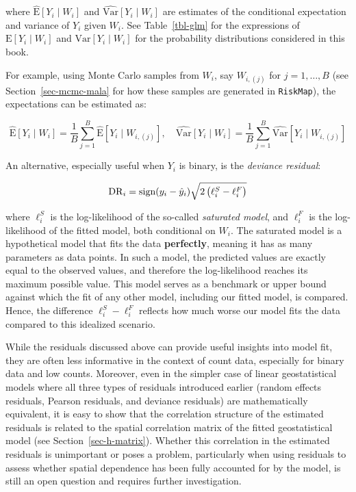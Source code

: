 \documentclass[
  letterpaper,
]{krantz}
\begin{document}
where \(\hat{\text{E}}\left[Y_i \mid W_i\right]\) and
\(\hat{\text{Var}}\left[Y_i \mid W_i\right]\) are estimates of the
conditional expectation and variance of \(Y_i\) given \(W_i\). See
Table~\ref{tbl-glm} for the expressions of
\(\text{E}\left[Y_i \mid W_i\right]\) and
\(\text{Var}\left[Y_i \mid W_i\right]\) for the probability
distributions considered in this book.

For example, using Monte Carlo samples from \(W_i\), say \(W_{i,(j)}\)
for \(j = 1, \ldots, B\) (see Section~\ref{sec-mcmc-mala} for how these
samples are generated in \texttt{RiskMap}), the expectations can be
estimated as:

\[
\hat{\text{E}}\left[Y_i \mid W_i\right] = \frac{1}{B} \sum_{j=1}^B \hat{\text{E}}\left[Y_i \mid W_{i,(j)}\right], \quad
\hat{\text{Var}}\left[Y_i \mid W_i\right] = \frac{1}{B} \sum_{j=1}^B \hat{\text{Var}}\left[Y_i \mid W_{i,(j)}\right]
\]

An alternative, especially useful when \(Y_i\) is binary, is the
\emph{deviance residual}:

\[
{\rm DR}_i = \text{sign}(y_i - \hat{y}_i) \sqrt{2 \left( \ell_i^{S} - \ell_i^{F} \right)}
\]

where \(\ell_i^{S}\) is the log-likelihood of the so-called
\emph{saturated model}, and \(\ell_i^{F}\) is the log-likelihood of the
fitted model, both conditional on \(W_i\). The saturated model is a
hypothetical model that fits the data \textbf{perfectly}, meaning it has
as many parameters as data points. In such a model, the predicted values
are exactly equal to the observed values, and therefore the
log-likelihood reaches its maximum possible value. This model serves as
a benchmark or upper bound against which the fit of any other model,
including our fitted model, is compared. Hence, the difference
\(\ell_i^{S} - \ell_i^{F}\) reflects how much worse our model fits the
data compared to this idealized scenario.

While the residuals discussed above can provide useful insights into
model fit, they are often less informative in the context of count data,
especially for binary data and low counts. Moreover, even in the simpler
case of linear geostatistical models where all three types of residuals
introduced earlier (random effects residuals, Pearson residuals, and
deviance residuals) are mathematically equivalent, it is easy to show
that the correlation structure of the estimated residuals is related to
the spatial correlation matrix of the fitted geostatistical model (see
Section~\ref{sec-h-matrix}). Whether this correlation in the estimated
residuals is unimportant or poses a problem, particularly when using
residuals to assess whether spatial dependence has been fully accounted
for by the model, is still an open question and requires further
investigation.
\end{document}
